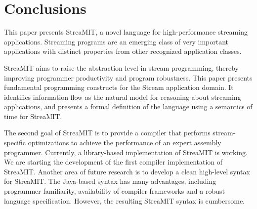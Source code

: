 \section{Conclusions}
\label{sec:conc}
This paper presents StreaMIT, a novel language for high-performance
streaming applications.  Streaming programs are an emerging class of
very important applications with distinct properties from other
recognized application classes.

StreaMIT aims to raise the abstraction level in stream programming,
thereby improving programmer productivity and program robustness. This
paper presents fundamental programming constructs for the Stream
application domain. It identifies information flow as the natural
model for reasoning about streaming applications, and presents a
formal definition of the language using a semantics of time for
StreaMIT.

The second goal of StreaMIT is to provide a compiler that performs
stream-specific optimizations to achieve the performance of an expert
assembly programmer. Currently, a library-based implementation of
StreaMIT is working. We are starting the development of the first
compiler implementation of StreaMIT. Another area of future research
is to develop a clean high-level syntax for StreaMIT. The Java-based
syntax has many advantages, including programmer familiarity,
availability of compiler frameworks and a robust language
specification. However, the resulting StreaMIT syntax is cumbersome.
